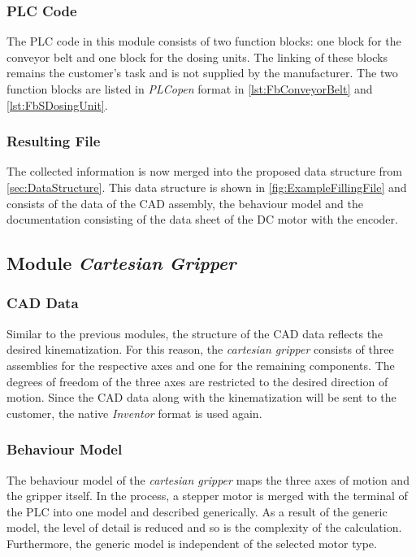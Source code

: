\subsubsection{PLC Code}
   The PLC code in this module consists of two function blocks: one block for the conveyor belt and one block for the dosing units. The linking of these blocks remains the customer's task and is not supplied by the manufacturer. The two function blocks are listed in \textit{PLCopen} format in \autoref{lst:FbConveyorBelt} and \autoref{lst:FbSDosingUnit}. 
    

\subsubsection{Resulting File}
    The collected information is now merged into the proposed data structure from \autoref{sec:DataStructure}. This data structure is shown in \autoref{fig:ExampleFillingFile} and consists of the data of the CAD assembly, the behaviour model and the documentation consisting of the data sheet of the DC motor with the encoder. 
	

\subsection{Module \textit{Cartesian Gripper}}
    \subsubsection{CAD Data}
    Similar to the previous modules, the structure of the CAD data reflects the desired kinematization. For this reason, the \textit{cartesian gripper} consists of three assemblies for the respective axes and one for the remaining components. The degrees of freedom of the three axes are restricted to the desired direction of motion. Since the CAD data along with the kinematization will be sent to the customer, the native \textit{Inventor} format is used again.
    
    \subsubsection{Behaviour Model}
    The behaviour model of the \textit{cartesian gripper} maps the three axes of motion and the gripper itself. In the process, a stepper motor is merged with the terminal of the PLC into one model and described generically. As a result of the generic model, the level of detail is reduced and so is the complexity of the calculation. Furthermore, the generic model is independent of the selected motor type.
    	
